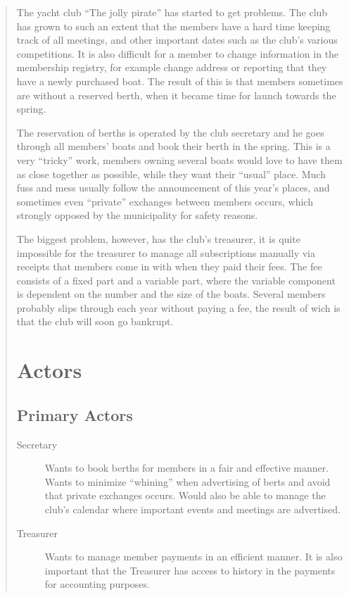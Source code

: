 \begin{quote}
The yacht club ``The jolly pirate'' has started to get problems. The club has
grown to such an extent that the members have a hard time keeping track of all
meetings, and other important dates such as the club's various competitions. It
is also difficult for a member to change information in the membership
registry, for example change address or reporting that they have a newly
purchased boat. The result of this is that members sometimes are without a
reserved berth, when it became time for launch towards the spring.

The reservation of berths is operated by the club secretary and he goes through
all members’ boats and book their berth in the spring. This is a very ``tricky''
work, members owning several boats would love to have them as close together as
possible, while they want their ``usual'' place. Much fuss and mess usually
follow the announcement of this year’s places, and sometimes even ``private''
exchanges between members occurs, which strongly opposed by the municipality
for safety reasons.

The biggest problem, however, has the club’s treasurer, it is quite impossible
for the treasurer to manage all subscriptions manually via receipts that
members come in with when they paid their fees. The fee consists of a fixed
part and a variable part, where the variable component is dependent on the
number and the size of the boats. Several members probably slips through each
year without paying a fee, the result of wich is that the club will soon go
bankrupt.


\section{Actors}
\subsection{Primary Actors}
\begin{description}
  \item[Secretary]
  Wants to book berths for members in a fair and effective manner. Wants to
  minimize ``whining'' when advertising of berts and avoid that private
  exchanges occurs. Would also be able to manage the club’s calendar where
  important events and meetings are advertised.
  
  \item[Treasurer]
  Wants to manage member payments in an efficient manner. It is also important
  that the Treasurer has access to history in the payments for accounting
  purposes.


\end{description}
\end{quote}
